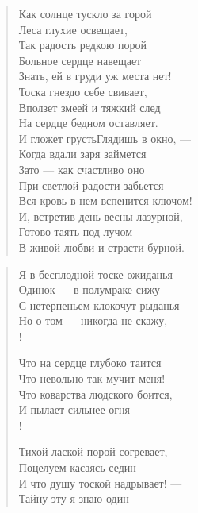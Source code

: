 \newpage
\vspace*{0cm}

\begin{verse}
Как солнце тускло за горой\\
Леса глухие освещает,\\
Так радость редкою порой\\
Больное сердце навещает\ldotst\\
Знать, ей в груди уж места нет!\\
Тоска гнездо себе свивает,\\
Вползет змеей и тяжкий след\\
На сердце бедном оставляет.\\
И гложет грусть\ldotst Глядишь в окно, ---\\
Когда вдали заря займется\ldotsq\\
Зато --- как счастливо оно\\
При светлой радости забьется\ldotse\\
Вся кровь в нем вспенится ключом!\\
И, встретив день весны лазурной,\\
Готово таять под лучом\\
В живой любви и страсти бурной.
\end{verse}


\newpage
\vspace*{0cm}

\begin{verse}
\begin{altverse}
Я в бесплодной тоске ожиданья\\
     Одинок --- в полумраке сижу\ldotst\\
С нетерпеньем клокочут рыданья\ldotst\\
     Но о том --- никогда не скажу, ---\\!

Что на сердце глубоко таится\ldotst\\
     Что невольно так мучит меня!\\
Что коварства людского боится,\\
     И пылает сильнее огня\ldotst\\!

Тихой лаской порой согревает,\\
     Поцелуем касаясь седин\ldotst\\
И что душу тоской надрывает! ---\\
	 Тайну эту я знаю один\ldotst
\end{altverse}
\end{verse}


